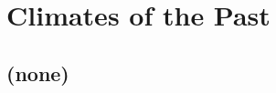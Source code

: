 
\cleardoublepage


\chapter{Climates of the Past}\label{ch:paleo-climate}

\hfill \break

\newpage

\section{(none)}

